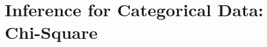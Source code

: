 \documentclass[../stats.tex]{subfiles}
\begin{document}
\chapter{Inference for Categorical Data: Chi-Square}
\end{document}
